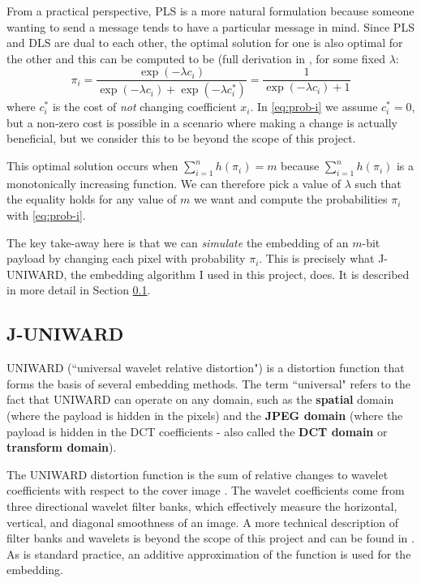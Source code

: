 \documentclass[11pt,a4paper,twoside,openright]{report}
\begin{document}
From a practical perspective, PLS is a more natural formulation because someone wanting to send a message tends to have a particular message in mind. Since PLS and DLS are dual to each other, the optimal solution for one is also optimal for the other and this can be computed to be (full derivation in \cite{stc-paper}, for some fixed $\lambda$:
	\begin{equation} \label{eq:prob-i}
		\pi_i = \frac{\exp{(-\lambda c_i)}}{\exp{(-\lambda c_i)} + \exp{(-\lambda c_i^{\ast})}} = \frac{1}{\exp{(-\lambda c_i)} + 1}
	\end{equation}
where $c_i^{\ast}$ is the cost of \textit{not} changing coefficient $x_i$. In \eqref{eq:prob-i} we assume $c_i^{\ast} = 0$, but a non-zero cost is possible in a scenario where making a change is actually beneficial, but we consider this to be beyond the scope of this project.

This optimal solution occurs when $\sum_{i=1}^{n} h(\pi_i) = m$ because $\sum_{i=1}^{n} h(\pi_i)$ is a monotonically increasing function. We can therefore pick a value of $\lambda$ such that the equality holds for any value of $m$ we want and compute the probabilities $\pi_i$ with \eqref{eq:prob-i}.

The key take-away here is that we can \textit{simulate} the embedding of an $m$-bit payload by changing each pixel with probability $\pi_i$. This is precisely what J-UNIWARD, the embedding algorithm I used in this project, does. It is described in more detail in Section \ref{sec:juniward}.


\subsection{J-UNIWARD} \label{sec:juniward}

UNIWARD (``universal wavelet relative distortion") \cite{uniward-paper} is a distortion function that forms the basis of several embedding methods. The term ``universal" refers to the fact that UNIWARD can operate on any domain, such as the \textbf{spatial} domain (where the payload is hidden in the pixels) and the \textbf{JPEG domain} (where the payload is hidden in the DCT coefficients - also called the \textbf{DCT domain} or \textbf{transform domain}).

The UNIWARD distortion function is the sum of relative changes to wavelet coefficients with respect to the cover image . The wavelet coefficients come from three directional wavelet filter banks, which effectively measure the horizontal, vertical, and diagonal smoothness of an image. A more technical description of filter banks and wavelets is beyond the scope of this project and can be found in \cite{uniward-paper}. As is standard practice, an additive approximation of the function is used for the embedding.
\end{document}
